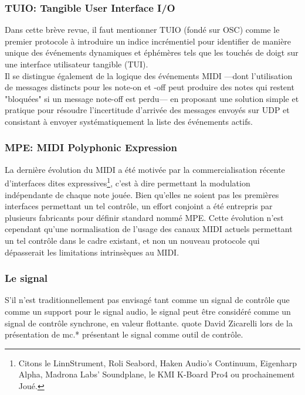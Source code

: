 \subsubsection{TUIO: Tangible User Interface I/O}

\noindent Dans cette brève revue, il faut mentionner \gls{TUIO} \cite{kaltenbrunner_tuio:_2005} (fondé sur \gls{OSC}) comme le premier protocole à introduire un indice incrémentiel pour identifier de manière unique des événements dynamiques et éphémères tels que les touchés de doigt sur une interface utilisateur tangible (\gls{TUI}).\\
\indent Il se distingue également de la logique des événements \gls{MIDI} —dont l'utilisation de messages distincts pour les note-on et -off peut produire des notes qui restent "bloquées" si un message note-off est perdu— en proposant une solution simple et pratique pour résoudre l'incertitude d'arrivée des messages envoyés sur \gls{UDP} et consistant à envoyer systématiquement la liste des événements actifs.

\subsubsection{\gls{MPE}: MIDI Polyphonic Expression}

\noindent La dernière évolution du \gls{MIDI} a été motivée par la commercialisation récente d'interfaces dites expressives\footnote{ Citons le LinnStrument, Roli Seabord, Haken Audio’s Continuum, Eigenharp Alpha, Madrona Labs’ Soundplane, le KMI K-Board Pro4 ou prochainement Joué.}, c'est à dire permettant la modulation indépendante de chaque note jouée. Bien qu'elles ne soient pas les premières interfaces permettant un tel contrôle, un effort conjoint a été entrepris par plusieurs fabricants pour définir standard nommé \gls{MPE}. Cette évolution n'est cependant qu'une normalisation de l'usage des canaux \gls{MIDI} actuels permettant un tel contrôle dans le cadre existant, et non un nouveau protocole qui dépasserait les limitations intrinsèques au \gls{MIDI}.

\subsubsection{Le signal}

\noindent S'il n'est traditionnellement pas envisagé tant comme un signal de contrôle que comme un support pour le signal audio, le signal peut être considéré comme un signal de contrôle synchrone, en valeur flottante. quote David Zicarelli lors de la présentation de mc.* présentant le signal comme outil de contrôle.


